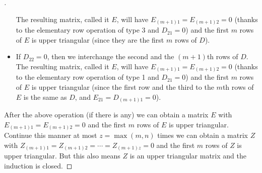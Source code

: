 \begin{proof}[]
\begin{itemize}
          The resulting matrix, called it \(E\), will have \(E_{(m + 1) 1} = E_{(m + 1) 2} = 0\) (thanks to the elementary row operation of type 3 and \(D_{2 1} = 0\)) and the first \(m\) rows of \(E\) is upper triangular (since they are the first \(m\) rows of \(D\)).
    \item If \(D_{2 2} = 0\), then we interchange the second and the \((m + 1)\)th rows of \(D\).
          The resulting matrix, called it \(E\), will have \(E_{(m + 1) 1} = E_{(m + 1) 2} = 0\) (thanks to the elementary row operation of type 1 and \(D_{2 1} = 0\)) and the first \(m\) rows of \(E\) is upper triangular (since the first row and the third to the \(m\)th rows of \(E\) is the same as \(D\), and \(E_{2 1} = D_{(m + 1) 1} = 0\)).
  \end{itemize}
  After the above operation (if there is any) we can obtain a matrix \(E\) with \(E_{(m + 1) 1} = E_{(m + 1) 2} = 0\) and the first \(m\) rows of \(E\) is upper triangular.
  Continue this manner at most \(z = \max(m, n)\) times we can obtain a matrix \(Z\) with \(Z_{(m + 1) 1} = Z_{(m + 1) 2} = \cdots = Z_{(m + 1) z} = 0\) and the first \(m\) rows of \(Z\) is upper triangular.
  But this also means \(Z\) is an upper triangular matrix and the induction is closed.
\end{proof}
